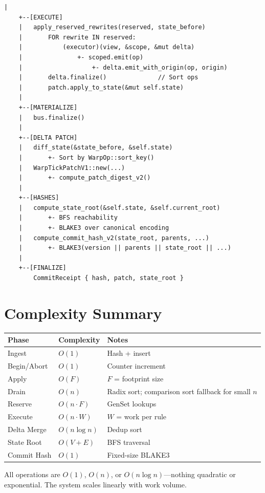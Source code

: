 \begin{lstlisting}[style=callgraph]
    |
    +--[EXECUTE]
    |   apply_reserved_rewrites(reserved, state_before)
    |       FOR rewrite IN reserved:
    |           (executor)(view, &scope, &mut delta)
    |               +- scoped.emit(op)
    |                   +- delta.emit_with_origin(op, origin)
    |       delta.finalize()              // Sort ops
    |       patch.apply_to_state(&mut self.state)
    |
    +--[MATERIALIZE]
    |   bus.finalize()
    |
    +--[DELTA PATCH]
    |   diff_state(&state_before, &self.state)
    |       +- Sort by WarpOp::sort_key()
    |   WarpTickPatchV1::new(...)
    |       +- compute_patch_digest_v2()
    |
    +--[HASHES]
    |   compute_state_root(&self.state, &self.current_root)
    |       +- BFS reachability
    |       +- BLAKE3 over canonical encoding
    |   compute_commit_hash_v2(state_root, parents, ...)
    |       +- BLAKE3(version || parents || state_root || ...)
    |
    +--[FINALIZE]
        CommitReceipt { hash, patch, state_root }
\end{lstlisting}

\section{Complexity Summary}

\begin{center}
\begin{tabular}{llp{5cm}}
\textbf{Phase} & \textbf{Complexity} & \textbf{Notes} \\
\hline
Ingest & $O(1)$ & Hash + insert \\
Begin/Abort & $O(1)$ & Counter increment \\
Apply & $O(F)$ & $F$ = footprint size \\
Drain & $O(n)$ & Radix sort; comparison sort fallback for small $n$ \\
Reserve & $O(n \cdot F)$ & GenSet lookups \\
Execute & $O(n \cdot W)$ & $W$ = work per rule \\
Delta Merge & $O(n \log n)$ & Dedup sort \\
State Root & $O(V + E)$ & BFS traversal \\
Commit Hash & $O(1)$ & Fixed-size BLAKE3 \\
\end{tabular}
\end{center}

All operations are $O(1)$, $O(n)$, or $O(n \log n)$---nothing quadratic or exponential.
The system scales linearly with work volume.

